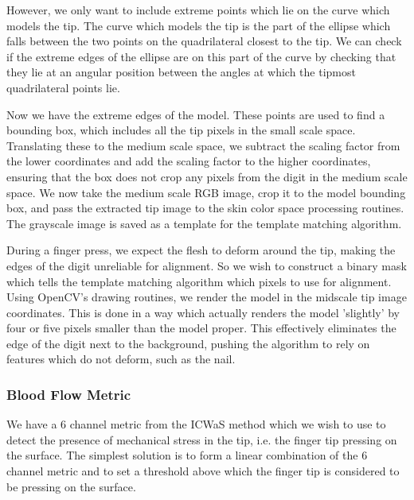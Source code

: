 However, we only want to include extreme points which lie on the curve which models the tip. The curve which models the tip is the part of the ellipse which falls between the two points on the quadrilateral closest to the tip. We can check if the extreme edges of the ellipse are on this part of the curve by checking that they lie at an angular position between the angles at which the tipmost quadrilateral points lie.

Now we have the extreme edges of the model. These points are used to find a bounding box, which includes all the tip pixels in the small scale space. Translating these to the medium scale space, we subtract the scaling factor from the lower coordinates and add the scaling factor to the higher coordinates, ensuring that the box does not crop any pixels from the digit in the medium scale space. We now take the medium scale RGB image, crop it to the model bounding box, and pass the extracted tip image to the skin color space processing routines. The grayscale image is saved as a template for the template matching algorithm.

During a finger press, we expect the flesh to deform around the tip, making the edges of the digit unreliable for alignment. So we wish to construct a binary mask which tells the template matching algorithm which pixels to use for alignment. Using OpenCV's drawing routines, we render the model in the midscale tip image coordinates. This is done in a way which actually renders the model 'slightly' by four or five pixels smaller than the model proper. This effectively eliminates the edge of the digit next to the background, pushing the algorithm to rely on features which do not deform, such as the nail.

\subsubsection{Blood Flow Metric}\label{sec:BloodFlowMetric}


\newcommand{\mL}{L^-}
\newcommand{\pL}{L^+}
\newcommand{\mCa}{Ca^-}
\newcommand{\pCa}{Ca^+}
\newcommand{\mCb}{Cb^-}
\newcommand{\pCb}{Cb^+}

\newcommand{\CmL}{C_{\mL}}
\newcommand{\CpL}{C_{\pL}}
\newcommand{\CmCa}{C_{\mCa}}
\newcommand{\CpCa}{C_{\pCa}}
\newcommand{\CmCb}{C_{\mCb}}
\newcommand{\CpCb}{C_{\pCb}}
We have a 6 channel metric from the ICWaS method which we wish to use to detect the presence of mechanical stress in the tip, i.e. the finger tip pressing on the surface. The simplest solution is to form a linear combination of the 6 channel metric and to set a threshold above which the finger tip is considered to be pressing on the surface. 

